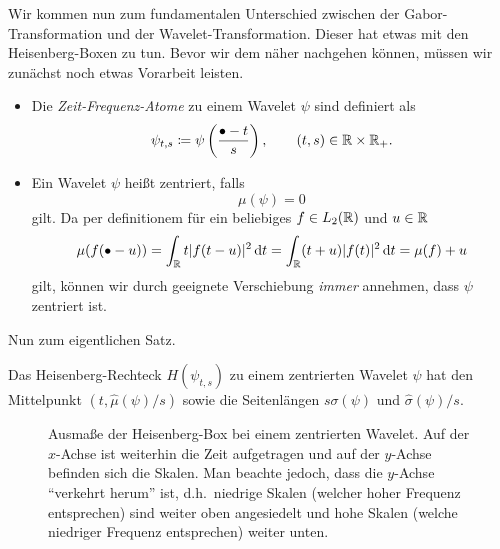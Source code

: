 Wir kommen nun zum fundamentalen Unterschied zwischen der Gabor-Transformation und der 
Wavelet-Transformation. Dieser hat etwas mit den Heisenberg-Boxen zu tun. Bevor wir dem näher
nachgehen können, müssen wir zunächst noch etwas Vorarbeit leisten.

\begin{definition} \leavevmode
\begin{itemize}
\item Die \emph{Zeit-Frequenz-Atome} zu einem Wavelet $ \psi $ sind definiert als
  \[
    \psi_{t,s} \coloneqq \psi\left(\frac{\bullet - t}{s}\right), \qquad (t,s) \in \mathbb{R} \times \mathbb{R}_{+}.
  \]
\item Ein Wavelet $ \psi $ heißt zentriert, falls
  \[
    \mu(\psi) = 0
  \]
  gilt. Da per definitionem für ein beliebiges $ f \in L_{2}(\mathbb{R}) $ und $ u \in \mathbb{R} $
  \[
      \mu(f(\bullet - u))
    = \int_{\R} t |f(t - u)|^{2} \dif t
    = \int_{\R} (t + u) |f(t)|^{2} \dif t
    = \mu(f) + u
  \]
  gilt, können wir durch geeignete Verschiebung \emph{immer} annehmen, dass $ \psi $ zentriert ist.
\end{itemize}
\end{definition}

Nun zum eigentlichen Satz.

\begin{proposition}
Das Heisenberg-Rechteck $ H(\psi_{t,s}) $ zu einem zentrierten Wavelet $ \psi $ hat den
Mittelpunkt $ (t, \widehat{\mu}(\psi) / s) $ sowie die Seitenlängen $ s \sigma(\psi) $ und
$ \widehat{\sigma}(\psi) / s $.
\begin{figure}[ht]
\centering
{}
\caption{Ausmaße der Heisenberg-Box bei einem zentrierten Wavelet. Auf der $ x $-Achse ist 
weiterhin die Zeit aufgetragen und auf der $ y $-Achse befinden sich die Skalen. Man beachte
jedoch, dass die $ y $-Achse \enquote{verkehrt herum} ist, d.h.\ niedrige Skalen (welcher hoher
Frequenz entsprechen) sind weiter oben angesiedelt und hohe Skalen (welche niedriger Frequenz
entsprechen) weiter unten.}
\label{fig:Heisenberg-Box-Wavelet}
\end{figure}
\end{proposition}


